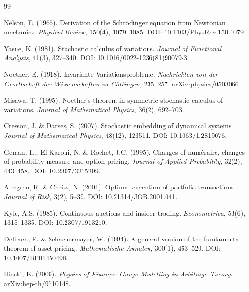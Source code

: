 \begin{thebibliography}{99}

Nelson, E. (1966). Derivation of the Schr\"odinger equation from Newtonian mechanics. \textit{Physical Review}, 150(4), 1079--1085. DOI: 10.1103/PhysRev.150.1079.

Yasue, K. (1981). Stochastic calculus of variations. \textit{Journal of Functional Analysis}, 41(3), 327--340. DOI: 10.1016/0022-1236(81)90079-3.

Noether, E. (1918). Invariante Variationsprobleme. \textit{Nachrichten von der Gesellschaft der Wissenschaften zu G\"ottingen}, 235--257. arXiv:physics/0503066.

Misawa, T. (1995). Noether's theorem in symmetric stochastic calculus of variations. \textit{Journal of Mathematical Physics}, 36(2), 692--703.

Cresson, J. \& Darses, S. (2007). Stochastic embedding of dynamical systems. \textit{Journal of Mathematical Physics}, 48(12), 123511. DOI: 10.1063/1.2819076.

Geman, H., El Karoui, N. \& Rochet, J.C. (1995). Changes of num\'eraire, changes of probability measure and option pricing. \textit{Journal of Applied Probability}, 32(2), 443--458. DOI: 10.2307/3215299.

Almgren, R. \& Chriss, N. (2001). Optimal execution of portfolio transactions. \textit{Journal of Risk}, 3(2), 5--39. DOI: 10.21314/JOR.2001.041.

Kyle, A.S. (1985). Continuous auctions and insider trading. \textit{Econometrica}, 53(6), 1315--1335. DOI: 10.2307/1913210.

Delbaen, F. \& Schachermayer, W. (1994). A general version of the fundamental theorem of asset pricing. \textit{Mathematische Annalen}, 300(1), 463--520. DOI: 10.1007/BF01450498.

Ilinski, K. (2000). \textit{Physics of Finance: Gauge Modelling in Arbitrage Theory}. arXiv:hep-th/9710148.

\end{thebibliography}


